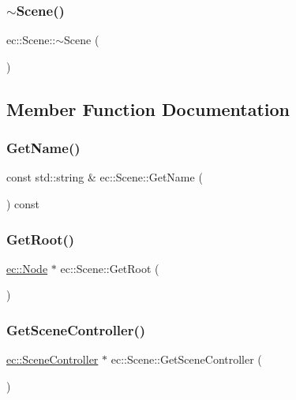 \subsubsection{\texorpdfstring{$\sim$\+Scene()}{~Scene()}}
{\footnotesize\ttfamily ec\+::\+Scene\+::$\sim$\+Scene (\begin{DoxyParamCaption}{ }\end{DoxyParamCaption})\hspace{0.3cm}{\ttfamily [virtual]}}



\subsection{Member Function Documentation}
\mbox{\label{classec_1_1_scene_a1646cecfcece12eec99d904a4351d21c}} 
\subsubsection{\texorpdfstring{Get\+Name()}{GetName()}}
{\footnotesize\ttfamily const std\+::string \& ec\+::\+Scene\+::\+Get\+Name (\begin{DoxyParamCaption}{ }\end{DoxyParamCaption}) const}

\mbox{\label{classec_1_1_scene_aa2c014fb59f0b51abe5de601a93297d5}} 
\subsubsection{\texorpdfstring{Get\+Root()}{GetRoot()}}
{\footnotesize\ttfamily \mbox{\hyperlink{classec_1_1_node}{ec\+::\+Node}} $\ast$ ec\+::\+Scene\+::\+Get\+Root (\begin{DoxyParamCaption}{ }\end{DoxyParamCaption})}

\mbox{\label{classec_1_1_scene_ac3e1522d93014a5f19193cc3d173d64a}} 
\subsubsection{\texorpdfstring{Get\+Scene\+Controller()}{GetSceneController()}}
{\footnotesize\ttfamily \mbox{\hyperlink{classec_1_1_scene_controller}{ec\+::\+Scene\+Controller}} $\ast$ ec\+::\+Scene\+::\+Get\+Scene\+Controller (\begin{DoxyParamCaption}{ }\end{DoxyParamCaption})}

